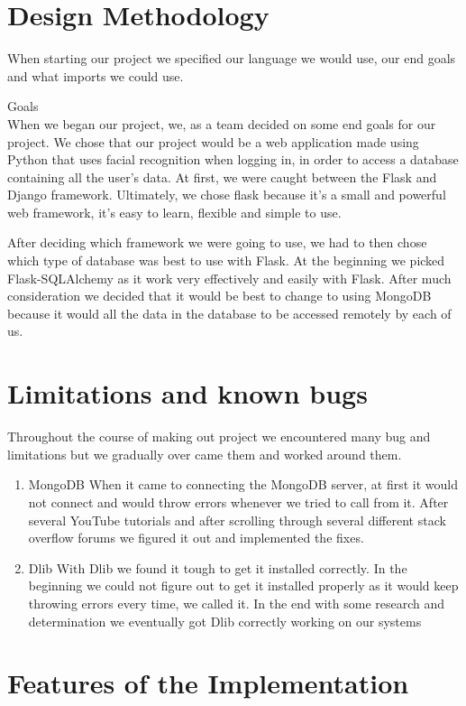 \documentclass{article}
\begin{document}
\section{Design Methodology}
When starting our project we specified our language we would use, our end goals  and what imports we could use.
\item	Goals \\
When we began our project, we, as a team decided on some end goals for our project.  We chose that our project would be a web application made using Python that uses facial recognition when logging in, in order to access a database containing all the user’s data.
At first, we were caught between the Flask and Django framework. Ultimately, we chose flask because it’s a small and powerful web framework, it’s easy to learn, flexible and simple to use.\medskip

After deciding which framework we were going to use, we had to then chose which type of database was best to use with Flask. At the beginning we picked Flask-SQLAlchemy as it work very effectively and easily with Flask. After much consideration we decided that it would be best to change to using MongoDB because it would all the data in the database to be accessed remotely by each of us.

\section{Limitations and known bugs}
Throughout the course of making out project we encountered many bug and limitations but we gradually over came them and worked around them.
\begin{enumerate}
\item MongoDB
When it came to connecting the MongoDB server, at first it would not connect and would throw errors whenever we tried to call from it. After several YouTube tutorials and after scrolling through several different stack overflow forums we figured it out and implemented the fixes. 
\item Dlib
With Dlib we found it tough to get it installed correctly. In the beginning we could not figure out to get it installed properly as it would keep throwing errors every time, we called it. In the end with some research and determination we eventually got Dlib correctly working on our systems
\end{enumerate}


\section{Features of the Implementation}
\end{document}

